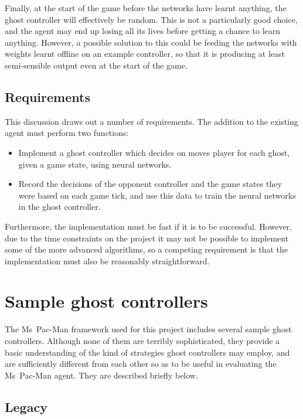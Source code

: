 Finally, at the start of the game before the networks have learnt anything, the ghost controller will effectively be random.  This is not a particularly good choice, and the agent may end up losing all its lives before getting a chance to learn anything.  However, a possible solution to this could be feeding the networks with weights learnt offline on an example controller, so that it is producing at least semi-sensible output even at the start of the game.

\subsection{Requirements}

This discussion draws out a number of requirements.  The addition to the existing agent must perform two functions:

\begin{itemize}
\item Implement a ghost controller which decides on moves player for each ghost, given a game state, using neural networks.
\item Record the decisions of the opponent controller and the game states they were based on each game tick, and use this data to train the neural networks in the ghost controller.
\end{itemize}

Furthermore, the implementation must be fast if it is to be successful.  However, due to the time constraints on the project it may not be possible to implement some of the more advanced algorithms, so a competing requirement is that the implementation must also be reasonably straightforward.


\section{Sample ghost controllers}

The Ms~Pac-Man framework used for this project includes several sample ghost controllers.  Although none of them are terribly sophisticated, they provide a basic understanding of the kind of strategies ghost controllers may employ, and are sufficiently different from each other so as to be useful in evaluating the Ms~Pac-Man agent.  They are described briefly below.

\subsection{Legacy}

